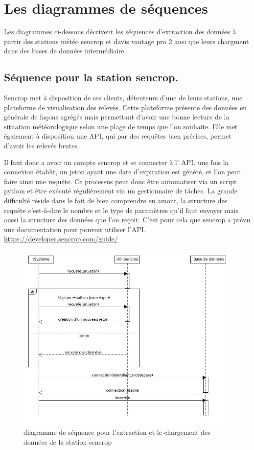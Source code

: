 \section{Les diagrammes de séquences}
 
Les diagrammes ci-dessous décrivent les séquences d’extraction des données à partir des stations météo sencrop et davis vantage pro 2 ansi que leurs chargment dans des bases de données intermédiaire.

\subsection{Séquence pour la station sencrop.}
Sencrop met à disposition de ses clients, détenteurs d’une de leurs stations, une plateforme de visualisation des relevés. Cette plateforme présente des données en générale de façons agrégés mais permettant d’avoir une bonne lecture de la situation météorologique selon une plage de temps que l’on souhaite. Elle met également à disposition une API, qui par des requêtes bien précises, permet d’avoir les relevés brutes.  

Il faut donc a avoir un compte sencrop et se connecter à l’ \gls{API}. une fois la connexion établit, un jeton ayant une date d’expiration est généré, et l’on peut faire ainsi une requête. Ce processus peut donc être automatiser via un script python et être exécuté régulièrement via un gestionnaire de tâches. La grande difficulté réside dans le fait de bien comprendre en amont, la structure des requête c’est-à-dire le nombre et le type de paramètres qu’il faut envoyer mais aussi la structure des données que l’on reçoit. C’est pour cela que sencrop a prévu une documentation pour pouvoir utiliser l’API. 
\newline
\url{https://developer.sencrop.com/guide/}  
\begin{figure}[!h]
    \label{diagramme de séquence stéation sencrop}
    \centering
     \includegraphics[width=.7\textwidth]{images/sencrop_senquence_diagrame.jpg}
    \caption{diagramme de séquence pour l'extraction et le chargement des données de la station sencrop}
  
\end{figure}

